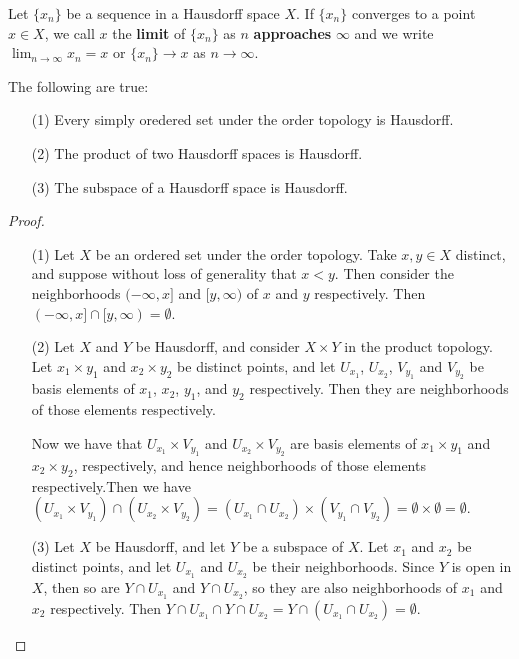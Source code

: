 \begin{definition}
    Let $\{x_n\}$ be a sequence in a Hausdorff space  $X$. If  $\{x_n\}$
    converges to a point $x \in X$, we call  $x$ the \textbf{limit} of
    $\{x_n\}$ as $n$  \textbf{approaches} $\infty$ and we write $\lim_{n
    \rightarrow \infty}{x_n}=x$ or $\{x_n\} \rightarrow x$ as $n \rightarrow
    \infty$.
\end{definition}

\begin{theorem}\label{1.6.11}
    The following are true:
        \begin{enumerate}
            \item[(1)] Every simply oredered set under the order topology is
                Hausdorff.

            \item[(2)] The product of two Hausdorff spaces is Hausdorff.

            \item[(3)] The subspace of a Hausdorff space is Hausdorff.
        \end{enumerate}
\end{theorem}
\begin{proof}
    \begin{enumerate}
        \item[(1)] Let $X$ be an ordered set under the order topology. Take  $x,y \in
            X$ distinct, and suppose without loss of generality that $x<y$. Then
            consider the neighborhoods  $(-\infty,x]$ and  $[y,\infty)$ of  $x$
            and  $y$ respectively. Then  $(-\infty,x] \cap
            [y,\infty)=\emptyset$.

        \item[(2)] Let $X$ and  $Y$ be Hausdorff, and consider  $X \times Y$ in the
            product topology. Let  $ x_1 \times y_1$ and $ x_2 \times y_2$ be
            distinct points, and let $U_{x_1}$, $U_{x_2}$, $V_{y_1}$ and
            $V_{y_2}$ be basis elements of $ x_1$, $ x_2$, $y_1$, and $y_2$
            respectively. Then they are neighborhoods of those elements
            respectively.

            Now we have that $U_{x_1} \times V_{y_1}$ and $U_{x_2} \times
            V_{y_2}$ are basis elements of $ x_1 \times y_1$ and $ x_2 \times
            y_2$, respectively, and hence neighborhoods of those elements
            respectively.Then we have $(U_{x_1} \times V_{y_1}) \cap (U_{x_2} \times
            V_{y_2})=(U_{x_1} \cap U_{x_2}) \times (V_{y_1} \cap V_{y_2}) = \emptyset
            \times \emptyset =\emptyset$.

        \item[(3)] Let $X$ be Hausdorff, and let  $Y$ be a subspace of  $X$. Let  $x_1$
            and $x_2$ be distinct points, and let  $U_{x_1}$ and $U_{x_2}$ be
            their neighborhoods. Since $Y$ is open in  $X$, then so are  $Y \cap
            U_{x_1}$ and $Y \cap U_{x_2}$, so they are also neighborhoods of $
            x_1$ and $ x_2$ respectively. Then $Y \cap
            U_{x_1} \cap Y \cap U_{x_2}=Y \cap (U_{x_1} \cap
            U_{x_2})=\emptyset$.
    \end{enumerate}
\end{proof}
